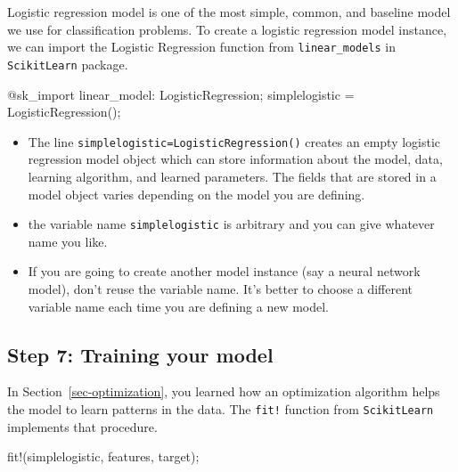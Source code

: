 \documentclass[
  letterpaper,
]{book}
\newenvironment{Shaded}{\begin{snugshade}}{\end{snugshade}}
\newcommand{\FunctionTok}[1]{\textcolor[rgb]{0.28,0.35,0.67}{#1}}
\newcommand{\NormalTok}[1]{\textcolor[rgb]{0.00,0.23,0.31}{#1}}
\newcommand{\OperatorTok}[1]{\textcolor[rgb]{0.37,0.37,0.37}{#1}}
\newcommand{\PreprocessorTok}[1]{\textcolor[rgb]{0.68,0.00,0.00}{#1}}
\providecommand{\tightlist}{%
  \setlength{\itemsep}{0pt}\setlength{\parskip}{0pt}}\usepackage{longtable,booktabs,array}
\begin{document}
Logistic regression model is one of the most simple, common, and
baseline model we use for classification problems. To create a logistic
regression model instance, we can import the Logistic Regression
function from \texttt{linear\_models} in \texttt{ScikitLearn} package.

\begin{Shaded}
\begin{Highlighting}[]
\PreprocessorTok{@sk\_import}\NormalTok{ linear\_model}\OperatorTok{:}\NormalTok{ LogisticRegression;}
\NormalTok{simplelogistic }\OperatorTok{=} \FunctionTok{LogisticRegression}\NormalTok{();}
\end{Highlighting}
\end{Shaded}

\begin{itemize}
\tightlist
\item
  The line \texttt{simplelogistic=LogisticRegression()} creates an empty
  logistic regression model object which can store information about the
  model, data, learning algorithm, and learned parameters. The fields
  that are stored in a model object varies depending on the model you
  are defining.
\item
  the variable name \texttt{simplelogistic} is arbitrary and you can
  give whatever name you like.
\item
  If you are going to create another model instance (say a neural
  network model), don't reuse the variable name. It's better to choose a
  different variable name each time you are defining a new model.
\end{itemize}

\hypertarget{step-7-training-your-model}{%
\subsection*{Step 7: Training your
model}\label{step-7-training-your-model}}

In Section~\ref{sec-optimization}, you learned how an optimization
algorithm helps the model to learn patterns in the data. The
\texttt{fit!} function from \texttt{ScikitLearn} implements that
procedure.

\begin{Shaded}
\begin{Highlighting}[]
\FunctionTok{fit!}\NormalTok{(simplelogistic, features, target);}
\end{Highlighting}
\end{Shaded}
\end{document}
